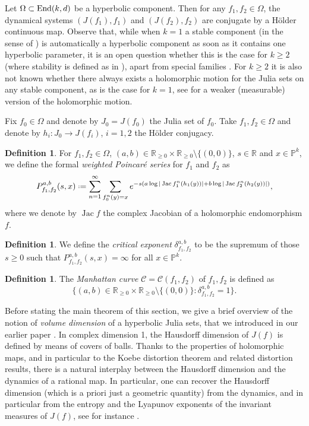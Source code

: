\documentclass[11pt]{amsart}
\theoremstyle{plain}
\theoremstyle{definition}
\newtheorem{defn}[thm]{Definition}
\theoremstyle{remark}
\newcommand{\bbP}{\mathbb{P}}
\newcommand*{\defeq}{\mathrel{\vcenter{\baselineskip0.5ex \lineskiplimit0pt
			\hbox{\scriptsize.}\hbox{\scriptsize.}}}%
	=}
\DeclareMathOperator{\Jac}{Jac}
\begin{document}
Let $\Omega\subset {\rm End} (k,d)$
be a hyperbolic component. Then for any $f_1,f_2 \in \Omega$, the dynamical systems $(J(f_1),f_1)$ and $(J(f_2),f_2)$ are conjugate by a H\"older continuous map. 
Observe that, while when $k= 1$ a stable component (in the sense of 
\cite{Lyu83typical, MSS83}) 
is automatically a hyperbolic component as soon as it contains one hyperbolic parameter, it is an open question whether this 
is the case for $k \geq 2$ (where stability is defined as in \cite{BBD18,B19}), 
apart from special families \cite{AB23}.
For $k\geq 2$
it is also not known whether there always exists a holomorphic motion for the Julia sets on any stable component, as is the case for $k=1$, see \cite{BBD18,BR24} for a weaker (measurable)
version of the holomorphic motion.

Fix $f_0 \in \Omega$ and denote by $J_0=J(f_0)$ the Julia set of $f_0$. Take $f_1,f_2 \in \Omega$ and denote by $h_i \colon J_0 \to J(f_i)$, $i=1,2$ the H\"older conjugacy.

\begin{defn}
For $f_1,f_2 \in \Omega$, $(a,b)\in\mathbb{R}_{\ge 0} \times \mathbb{R}_{\ge 0} \setminus \{(0,0)\}$,
$s \in \mathbb{R}$ and $x \in \mathbb{P}^k$, we define the formal {\it weighted Poincar\'e series} for $f_1$ and $f_2$ as
\begin{equation*}
P_{f_1,f_2}^{a,b}(s,x) \defeq \sum_{n=1}^{\infty} \sum_{f_0^n(y)=x}e^{-s(a\log|\Jac f_1^n(h_1(y))|+b\log|\Jac f_2^n(h_2(y))|)},
\end{equation*}
where we denote by $\Jac f$ 
the complex Jacobian of a holomorphic endomorphism $f$.
\end{defn}

\begin{defn}
We define the {\it critical exponent} $\delta_{f_1,f_2}^{a,b}$ to be the supremum of those $s \ge 0$ such that $P_{f_1,f_2}^{a,b}(s,x) =\infty$ for all $x \in \bbP^k$.
\end{defn}

\begin{defn}
The {\it Manhattan curve} $\mathcal{C}=\mathcal{C}(f_1,f_2)$ of $f_1,f_2$ is defined as
$$\{(a,b)\in\mathbb{R}_{\ge 0} \times \mathbb{R}_{\ge 0} \setminus \{(0,0)\}: \delta_{f_1,f_2}^{a,b} = 1\}.$$
\end{defn}

Before
stating
the main theorem of this section, we give a brief overview of the notion of {\it volume dimension} of a hyperbolic Julia sets,
that we introduced in our earlier paper \cite{BHMane}.
In complex dimension 1, 
the Hausdorff dimension of $J(f)$
is defined by means of covers of balls.
Thanks to the properties of holomorphic maps, and in particular
to the Koebe distortion theorem and related distortion results,
there is a natural interplay
between the Hausdorff dimension and the dynamics of a rational map. In particular, one can recover the Hausdorff dimension (which is a priori just a geometric quantity) from the dynamics, and in particular from the entropy and the Lyapunov exponents of the invariant measures of $J(f)$, see for instance
\cite{manning1984dimension,Mane}.
\end{document}
